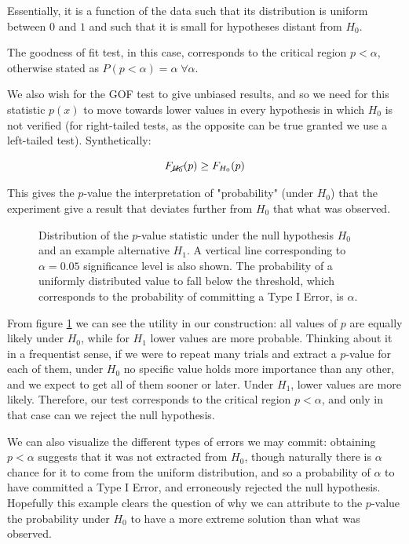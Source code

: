 Essentially, it is a function of the data such that its distribution is uniform between $0$ and $1$ and such that it is small for hypotheses distant from $H_0$.

The goodness of fit test, in this case, corresponds to the critical region $p<\alpha$, otherwise stated as $P(p<\alpha)=\alpha\;\forall\alpha$.

We also wish for the GOF test to give unbiased results, and so we need for this statistic $p(x)$ to move towards lower values in every hypothesis in which $H_0$ is not verified (for right-tailed tests, as the opposite can be true granted we use a left-tailed test). Synthetically:

	\[
	F_{\cancel{H_0}}(p) \geq F_{H_0}(p)
	\]

This gives the $p$-value the interpretation of "probability" (under $H_0$) that the experiment give a result that deviates further from $H_0$ that what was observed. 

\begin{figure}[H]
	\centering
	
	\caption{Distribution of the $p$-value statistic under the null hypothesis $H_0$ and an example alternative $H_1$. A vertical line corresponding to $\alpha=0.05$ significance level is also shown. The probability of a uniformly distributed value to fall below the threshold, which corresponds to the probability of committing a Type I Error, is $\alpha$.}
	\label{images/p_value_plot}
\end{figure}

From figure \ref{images/p_value_plot} we can see the utility in our construction: all values of $p$ are equally likely under $H_0$, while for $H_1$ lower values are more probable. Thinking about it in a frequentist sense, if we were to repeat many trials and extract a $p$-value for each of them, under $H_0$ no specific value holds more importance than any other, and we expect to get all of them sooner or later. Under $H_1$, lower values are more likely. Therefore, our test corresponds to the critical region $p<\alpha$, and only in that case can we reject the null hypothesis. 

We can also visualize the different types of errors we may commit: obtaining $p<\alpha$ suggests that it was not extracted from $H_0$, though naturally there is $\alpha$ chance for it to come from the uniform distribution, and so a probability of $\alpha$ to have committed a Type I Error, and erroneously rejected the null hypothesis. Hopefully this example clears the question of why we can attribute to the $p$-value the probability under $H_0$ to have a more extreme solution than what was observed.

